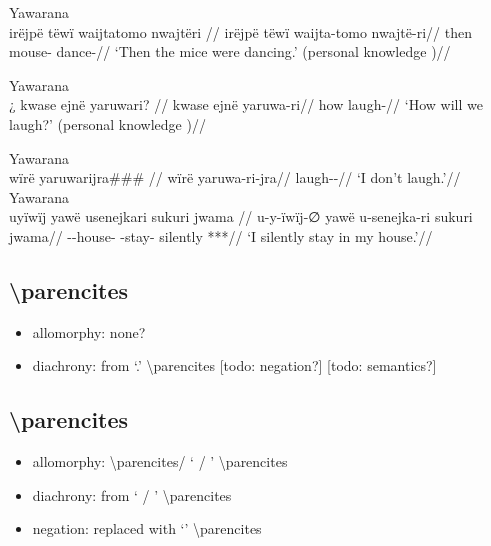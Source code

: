 \documentclass{memoir}
\begin{document}
\ex  Yawarana  \\\label{ctorat-16}
\begingl \glpreamble irëjpë tëwï waijtatomo nwajtëri //
\gla irëjpë tëwï waijta-tomo nwajtë-ri//
\glb then  mouse- dance-//
\glft ‘Then the mice were dancing.’ (personal knowledge
)//
\endgl
\xe

\ex  Yawarana  \\\label{convrisamaj-6}
\begingl \glpreamble ¿ kwase ejnë yaruwari? //
\gla kwase ejnë yaruwa-ri//
\glb how  laugh-//
\glft ‘How will we laugh?’ (personal knowledge
)//
\endgl
\xe

\pex\label{gnomicri}    \a Yawarana\\
    \label{convrisamaj-4}        \begingl
        \glpreamble wïrë yaruwarijra\#\#\# //
        \gla wïrë yaruwa-ri-jra//
        \glb {} laugh--//
            \glft ‘I don’t laugh.’//  
        \endgl 
    \a Yawarana\\
    \label{convrisamaj-28}        \begingl
        \glpreamble uyïwïj yawë usenejkari sukuri jwama //
        \gla u-y-ïwïj-∅ yawë u-senejka-ri sukuri jwama//
        \glb {}--house-  -stay- silently ***//
            \glft ‘I silently stay in my house.’//  
        \endgl 
\xe

\subsection{\texorpdfstring{
\textbackslash parencites}{ \textbackslash parencites}}

\begin{itemize}
\tightlist
\item
  allomorphy: none?
\item
  diachrony: from  `.'
  \textbackslash parencites {[}todo: negation?{]} {[}todo: semantics?{]}
\end{itemize}

\subsection{\texorpdfstring{
\textbackslash parencites}{ \textbackslash parencites}}

\begin{itemize}
\tightlist
\item
  allomorphy:  \textbackslash parencites/ `
  / ' \textbackslash parencites
\item
  diachrony: from  ` / '
  \textbackslash parencites
\item
  negation: replaced with  `' \textbackslash parencites
\end{itemize}
\end{document}
